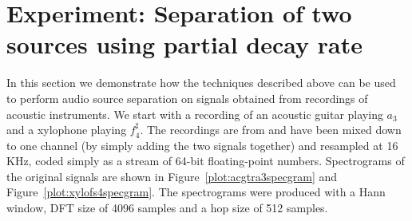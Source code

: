 \chapter{Experiment: Separation of two sources using partial decay rate
\label{chap:decaysep}}

In this section we demonstrate how the techniques described above can be used to
perform audio source separation on signals obtained from recordings of acoustic
instruments. We start with a recording of an acoustic guitar playing $a_{3}$ and
a xylophone playing $f_{4}^{\sharp}$.  The recordings are from
\cite{opolko1987mcgill} and have been mixed down to one channel (by simply
adding the two signals together) and resampled at 16 KHz, coded simply as a
stream of 64-bit floating-point numbers. Spectrograms of the original signals
are shown in Figure~\ref{plot:acgtra3specgram} and
Figure~\ref{plot:xylofs4specgram}. The spectrograms were produced with a Hann
window, DFT size of 4096 samples and a hop size of 512 samples.

